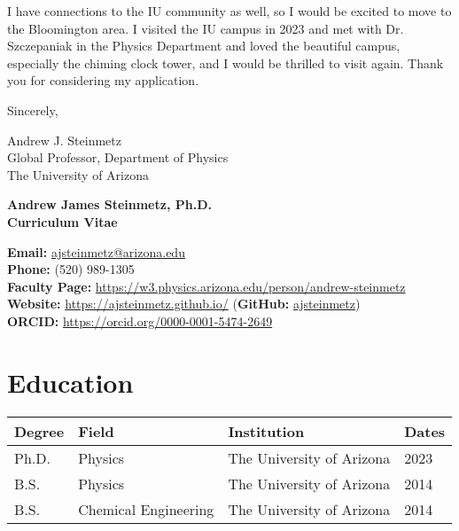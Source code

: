 \documentclass[11pt]{article}
\begin{document}
I have connections to the IU community as well, so I would be excited to move to the Bloomington area. I visited the IU campus in 2023 and met with Dr. Szczepaniak in the Physics Department and loved the beautiful campus, especially the chiming clock tower, and I would be thrilled to visit again. Thank you for considering my application.

\vspace{1em}

\noindent
Sincerely,

\vspace{2em}

\noindent
Andrew J. Steinmetz\\
Global Professor, Department of Physics\\
The University of Arizona

\clearpage

\begin{center}
    {\Large\textbf{Andrew James Steinmetz, Ph.D.}}\\[0.5em]
    {\large\textbf{Curriculum Vitae}}
\end{center}

\noindent
\textbf{Email:} \href{mailto:ajsteinmetz@arizona.edu}{ajsteinmetz@arizona.edu}\\[0.3em]
\textbf{Phone:} (520) 989-1305\\[0.3em]
\textbf{Faculty Page:} \href{https://w3.physics.arizona.edu/person/andrew-steinmetz}{https://w3.physics.arizona.edu/person/andrew-steinmetz}\\[0.3em]
\textbf{Website:} \href{https://ajsteinmetz.github.io/}{https://ajsteinmetz.github.io/} (\textbf{GitHub:} \href{https://github.com/ajsteinmetz/}{ajsteinmetz})\\[0.3em]
\textbf{ORCID:} \href{https://orcid.org/0000-0001-5474-2649}{https://orcid.org/0000-0001-5474-2649}

\section*{Education}
{\normalsize
\begin{tabular}{@{}p{2.8cm} p{4.0cm} p{5.0cm} p{3.2cm}@{}}
\toprule
\textbf{Degree} & \textbf{Field} & \textbf{Institution} & \textbf{Dates} \\
\midrule
Ph.D. & Physics             & The University of Arizona & 2023 \\
B.S.   & Physics             & The University of Arizona & 2014 \\
B.S.   & Chemical Engineering& The University of Arizona & 2014 \\
\bottomrule
\end{tabular}
}
\end{document}

